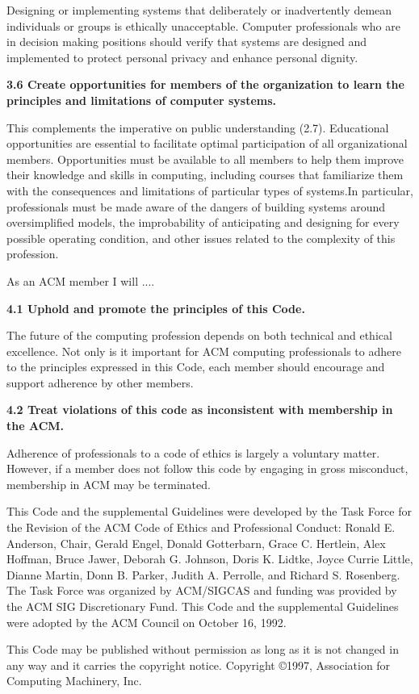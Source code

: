 Designing or implementing systems that deliberately or inadvertently demean individuals or groups is ethically unacceptable. Computer professionals who are in decision making positions should verify that systems are designed and implemented to protect personal privacy and enhance personal dignity.

\vspace{.1in}\noindent\textbf{3.6 Create opportunities for members of the organization to learn the principles and limitations of computer systems.}

This complements the imperative on public understanding (2.7). Educational opportunities are essential to facilitate optimal participation of all organizational members. Opportunities must be available to all members to help them improve their knowledge and skills in computing, including courses that familiarize them with the consequences and limitations of particular types of systems.In particular, professionals must be made aware of the dangers of building systems around oversimplified models, the improbability of anticipating and designing for every possible operating condition, and other issues related to the complexity of this profession.




\vspace{.2in}\vspace{.1in}

As an ACM member I will ....

\vspace{.1in}\noindent\textbf{4.1 Uphold and promote the principles of this Code.}

The future of the computing profession depends on both technical and ethical excellence. Not only is it important for ACM computing professionals to adhere to the principles expressed in this Code, each member should encourage and support adherence by other members.

\vspace{.1in}\noindent\textbf{4.2 Treat violations of this code as inconsistent with membership in the ACM.}

Adherence of professionals to a code of ethics is largely a voluntary matter. However, if a member does not follow this code by engaging in gross misconduct, membership in ACM may be terminated.




\vspace{.2in}This Code and the supplemental Guidelines were developed by the Task Force for the Revision of the ACM Code of Ethics and Professional Conduct: Ronald E. Anderson, Chair, Gerald Engel, Donald Gotterbarn, Grace C. Hertlein, Alex Hoffman, Bruce Jawer, Deborah G. Johnson, Doris K. Lidtke, Joyce Currie Little, Dianne Martin, Donn B. Parker, Judith A. Perrolle, and Richard S. Rosenberg. The Task Force was organized by ACM/SIGCAS and funding was provided by the ACM SIG Discretionary Fund. This Code and the supplemental Guidelines were adopted by the ACM Council on October 16, 1992.


This Code may be published without permission as long as it is not changed in any way and it carries the copyright notice. Copyright \copyright 1997, Association for Computing Machinery, Inc.



